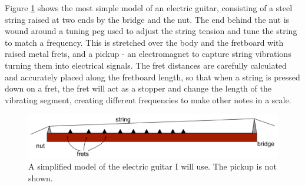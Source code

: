 Figure \ref{fig1} shows the most simple model of an electric guitar, consisting of a steel string raised at two ends by the bridge and the nut. The end behind the nut is wound around a tuning peg used to adjust the string tension and tune the string to match a frequency. This is stretched over the body and the fretboard with raised metal frets, and a pickup - an electromagnet to capture string vibrations turning them into electrical signals. The fret distances are carefully calculated and accurately placed along the fretboard length, so that when a string is pressed down on a fret, the fret will act as a stopper and change the length of the vibrating segment, creating different frequencies to make other notes in a scale. 
\begin{figure}[!htbp]
    \includegraphics[width=\textwidth]{./ee/fig1.png}
    \caption{A simplified model of the electric guitar I will use. The pickup is not shown.}\label{fig1}
\end{figure} 